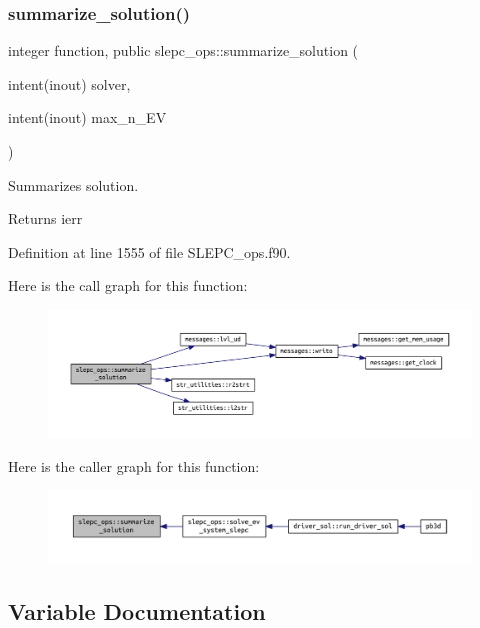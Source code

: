 \subsubsection{\texorpdfstring{summarize\+\_\+solution()}{summarize\_solution()}}
{\footnotesize\ttfamily integer function, public slepc\+\_\+ops\+::summarize\+\_\+solution (\begin{DoxyParamCaption}\item[{intent(inout)}]{solver,  }\item[{intent(inout)}]{max\+\_\+n\+\_\+\+EV }\end{DoxyParamCaption})}



Summarizes solution. 

\begin{DoxyReturn}{Returns}
ierr 
\end{DoxyReturn}


Definition at line 1555 of file S\+L\+E\+P\+C\+\_\+ops.\+f90.

Here is the call graph for this function\+:\nopagebreak
\begin{figure}[H]
\begin{center}
\leavevmode
\includegraphics[width=350pt]{namespaceslepc__ops_a03193dbc55e7061891d58e96a2bf1dd5_cgraph}
\end{center}
\end{figure}
Here is the caller graph for this function\+:\nopagebreak
\begin{figure}[H]
\begin{center}
\leavevmode
\includegraphics[width=350pt]{namespaceslepc__ops_a03193dbc55e7061891d58e96a2bf1dd5_icgraph}
\end{center}
\end{figure}


\subsection{Variable Documentation}
\mbox{\label{namespaceslepc__ops_ad57b5fd70608c1b97454963bdd1c4f5b}} 
